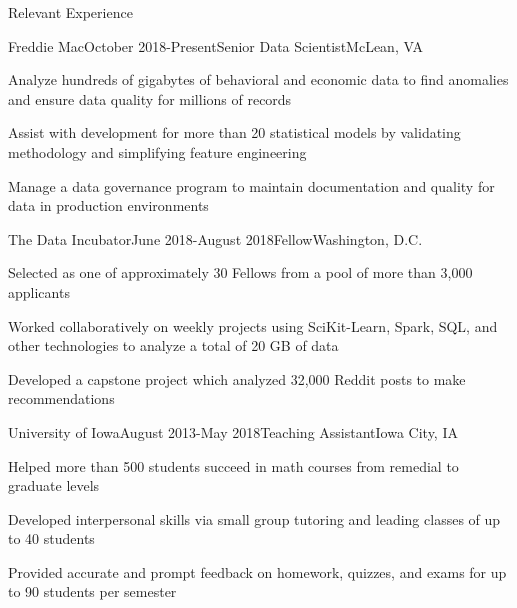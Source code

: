 \documentclass{resume} %
\begin{document}
\begin{rSection}{Relevant Experience}

\begin{rSubsection}{Freddie Mac}{October 2018-Present}{Senior Data Scientist}{McLean, VA}
\item Analyze hundreds of gigabytes of behavioral and economic data to find anomalies and ensure data quality for millions of records
\item Assist with development for more than 20 statistical models by validating methodology and simplifying feature engineering
\item Manage a data governance program to maintain documentation and quality for data in production environments
\end{rSubsection}

\begin{rSubsection}{The Data Incubator}{June 2018-August 2018}{Fellow}{Washington, D.C.}
\item Selected as one of approximately 30 Fellows from a pool of more than 3,000 applicants
\item Worked collaboratively on weekly projects using SciKit-Learn, Spark, SQL, and other technologies to analyze a total of 20 GB of data
\item Developed a capstone project which analyzed 32,000 Reddit posts to make recommendations
\end{rSubsection}

\begin{rSubsection}{University of Iowa}{August 2013-May 2018}{Teaching Assistant}{Iowa City, IA}
\item Helped more than 500 students succeed in math courses from remedial to graduate levels
\item Developed interpersonal skills via small group tutoring and leading classes of up to 40 students
\item Provided accurate and prompt feedback on homework, quizzes, and exams for up to 90 students per semester
\end{rSubsection}





\end{rSection}
\end{document}
